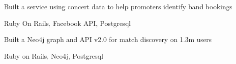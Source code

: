 \documentclass[]{modern}
\begin{document}
\begin{minipage}[t]{0.66\textwidth}

\begin{tightemize}
\item Built a service using concert data to help promoters identify band bookings
\item Ruby On Rails, Facebook API, Postgresql
\end{tightemize}
\sectionsep


\begin{tightemize}
\item Built a Neo4j graph and API v2.0 for match discovery on 1.3m users
\item Ruby on Rails, Neo4j, Postgresql
\end{tightemize}
\sectionsep


\end{minipage}
\end{document}

